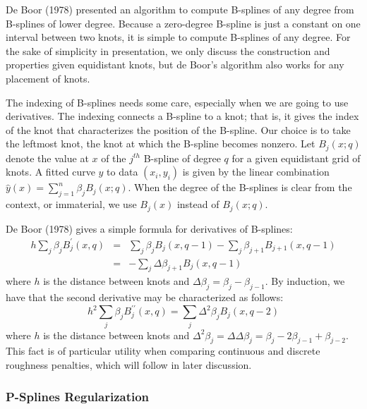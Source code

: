\documentclass[12pt]{article}
\newcommand*\needsparaphrased{\color{red}}
\newcommand*\outlineskeleton{\color{green}}
\begin{document}
{\needsparaphrased De Boor (1978)} presented an algorithm to compute B-splines of any degree from B-splines of lower degree. Because a zero-degree B-spline is just a constant on one interval between two knots, it is simple to compute B-splines of any degree. For the sake of simplicity in presentation, we only discuss the construction and properties given equidistant knots, but de Boor's algorithm also works for any placement of knots.

The indexing of B-splines needs some care, especially when we are going to use derivatives. The indexing connects a B-spline to a knot; that is, it gives the index of the knot that characterizes the position of the B-spline. Our choice is to take the leftmost knot, the knot at which the B-spline becomes nonzero. Let $B_j\left(x; q\right)$ denote the value at $x$ of the $j^{th}$ B-spline of degree $q$ for a given equidistant grid of knots. A fitted curve $\hat{y}$ to data $\left(x_i,y_i\right)$ is given by the linear combination $\hat{y}\left(x\right) = \sum_{j=1}^n \beta_{j} B_j\left(x; q\right)$. When the degree of the B-splines is clear from the context, or immaterial, we use $B_j\left(x\right)$ instead of $B_j\left(x; q\right)$.

De Boor (1978) gives a simple formula for derivatives of B-splines:
\begin{eqnarray}
h\sum_{j} \beta_j B_j^\prime \left(x,q\right) &=& \sum_{j} \beta_j B_j\left(x,q-1\right)-\sum_{j} \beta_{j+1} B_{j+1} \left(x,q-1\right) \nonumber \\ 
&=& -\sum_{j} \Delta\beta_{j+1} B_{j} \left(x,q-1\right) \label{bspline_deriv}
\end{eqnarray}
\noindent
where $h$ is the distance between knots and $\Delta \beta_j = \beta_j-\beta_{j-1}$. By induction, we have that the second derivative may be characterized as follows:
\begin{equation}
h^2\sum_{j} \beta_j B_j^{\prime \prime} \left(x,q\right) = \sum_{j} \Delta^2 \beta_{j} B_{j} \left(x,q-2\right) \label{bspline_2nd_deriv}
\end{equation}
\noindent
where $h$ is the distance between knots and $\Delta^2 \beta_j = \Delta\Delta \beta_j = \beta_j - 2\beta_{j-1}+\beta_{j-2} $. This fact is of particular utility when comparing continuous and discrete roughness penalties, which will follow in later discussion.



\subsubsection{{\outlineskeleton P-Splines Regularization}}
\end{document}
